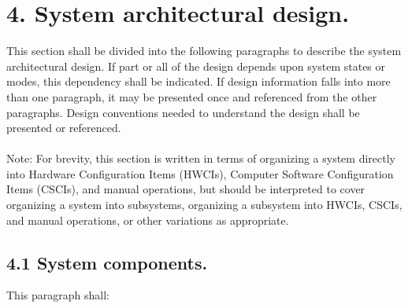 \section{4. System architectural design.}

This section shall be divided into the following paragraphs to describe
the system architectural design. If part or all of the design depends
upon system states or modes, this dependency shall be indicated. If
design information falls into more than one paragraph, it may be
presented once and referenced from the other paragraphs. Design
conventions needed to understand the design shall be presented or
referenced. \\\\ Note: For brevity, this section is written in terms of
organizing a system directly into Hardware Configuration Items (HWCIs),
Computer Software Configuration Items (CSCIs), and manual operations,
but should be interpreted to cover organizing a system into subsystems,
organizing a subsystem into HWCIs, CSCIs, and manual operations, or
other variations as appropriate.

\subsection{4.1 System components.}

This paragraph shall:

